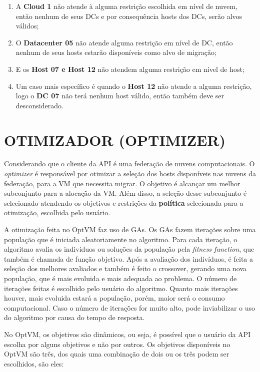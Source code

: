 \begin{enumerate}
\item A \textbf{Cloud 1} não atende à alguma restrição escolhida em nível de nuvem, então nenhum de seus DCs e por consequência hosts dos DCs, serão alvos válidos;
\item O \textbf{Datacenter 05} não atende alguma restrição em nível de DC, então nenhum de seus hosts estarão disponíveis como alvo de migração;
\item E os \textbf{Host 07 e Host 12} não atendem alguma restrição em nível de host;
\item Um caso mais específico é quando o \textbf{Host 12} não atende a alguma restrição, logo o \textbf{DC 07} não terá nenhum host válido, então também deve ser desconsiderado.
\end{enumerate}

\section{OTIMIZADOR (OPTIMIZER)}

Considerando que o cliente da API é uma federação de nuvens computacionais.
O \textit{optimizer} é responsável por otimizar a seleção dos hosts disponíveis nas nuvens da federação,
para a VM que necessita migrar. O objetivo é alcançar um melhor subconjunto para a alocação da VM. 
Além disso, a seleção desse subconjunto é selecionado atendendo os objetivos e restrições da \textbf{política} 
selecionada para a otimização, escolhida pelo usuário.

A otimização feita no OptVM faz uso de GAs. Os GAs fazem iterações sobre 
uma população que é iniciada aleatoriamente no algoritmo. Para cada iteração,
o algoritmo avalia os indivíduos ou soluções da população pela \textit{fitness function}, 
que também é chamada de função objetivo. Após a avaliação dos indivíduos, é
feita a seleção dos melhores avaliados e também é feito o crossover, gerando uma nova população,
que é mais evoluida e mais adequada ao problema. O número de iterações
feitas é escolhido pelo usuário do algoritmo. Quanto mais iterações houver, mais evoluida
estará a população, porém, maior será o consumo computacional. Caso o número de iterações
for muito alto, pode inviabilizar o uso do algoritmo por causa do tempo de resposta.

No OptVM, os objetivos são dinâmicos, ou seja, é possível que o usuário da API escolha por alguns
objetivos e não por outros. Os objetivos disponíveis no OptVM são três, dos quais uma combinação de
dois ou os três podem ser escolhidos, são eles:


